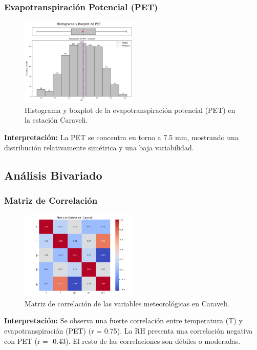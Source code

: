 \subsubsection*{Evapotranspiración Potencial (PET)}
\begin{figure}[H]
\centering
\includegraphics[width=0.5\textwidth]{resultados/por_estacion_meteorologica/Caraveli/PET_histograma.png}
\caption{Histograma y boxplot de la evapotranspiración potencial (PET) en la estación Caraveli.}
\label{fig:caraveli_PET}
\end{figure}
\textbf{Interpretación:} La PET se concentra en torno a 7.5 mm, mostrando una distribución relativamente simétrica y una baja variabilidad.

\subsection{Análisis Bivariado}

\subsubsection*{Matriz de Correlación}
\begin{figure}[H]
\centering
\includegraphics[width=0.5\textwidth]{resultados/por_estacion_meteorologica/Caraveli/matriz_correlacion.png}
\caption{Matriz de correlación de las variables meteorológicas en Caraveli.}
\label{fig:caraveli_corr}
\end{figure}
\textbf{Interpretación:} Se observa una fuerte correlación entre temperatura (T) y evapotranspiración (PET) (r = 0.75). La RH presenta una correlación negativa con PET (r = -0.43). El resto de las correlaciones son débiles o moderadas.

